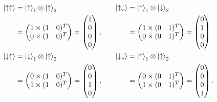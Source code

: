 \documentclass{article}
\begin{document}
\begin{align*}
    \ket{\uparrow \uparrow} &= \ket{\uparrow}_1\otimes \ket{\uparrow}_2&\quad \ket{\uparrow \downarrow}&=\ket{\uparrow}_1\otimes \ket{\downarrow}_2 \\
                            &=\begin{pmatrix}
                                1\times (1\quad 0)^T\\
                                0\times (1\quad 0)^T
                            \end{pmatrix}=\begin{pmatrix}
                                1\\0\\0\\0
                            \end{pmatrix},&\quad&=\begin{pmatrix}
                                1\times (0\quad 1)^T\\
                                0\times (0\quad 1)^T
                            \end{pmatrix}=\begin{pmatrix}
                                0\\1\\0\\0
                            \end{pmatrix}\\
    \ket{\downarrow \uparrow}&=\ket{\downarrow}_1\otimes \ket{\uparrow}_2&\quad \ket{\downarrow \downarrow}&=\ket{\uparrow}_1\otimes \ket{\uparrow}_2 \\
                             &=\begin{pmatrix}
                                 0\times (1\quad 0)^T \\
                                 1\times (1\quad 0)^T
                             \end{pmatrix}=\begin{pmatrix}
                                 0\\0\\1\\0
                             \end{pmatrix},&\quad&=\begin{pmatrix}
                                 0\times (0\quad 1)^T \\
                                 1\times(0\quad 1)^T
                             \end{pmatrix}=\begin{pmatrix}
                                 0\\0\\0\\1
                             \end{pmatrix}.
\end{align*}
\end{document}
